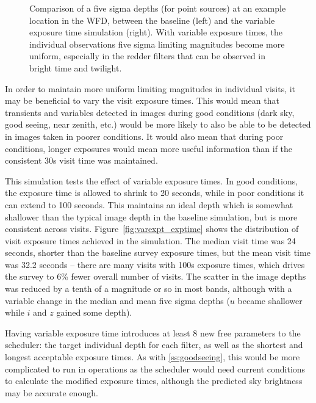 \begin{figure}
\caption{Comparison of a five sigma depths (for point sources) at an example location in the WFD, between the baseline (left) and the variable exposure time simulation (right). With variable exposure times, the individual observations five sigma limiting magnitudes become more uniform, especially in the redder filters that can be observed in bright time and twilight.}\label{fig:varexptime}
\end{figure}

In order to maintain more uniform limiting magnitudes in individual visits, it may be beneficial to vary the visit exposure times. This would mean that transients and variables detected in images during good conditions (dark sky, good seeing, near zenith, etc.) would be more likely to also be able to be detected in images taken in poorer conditions. It would also mean that during poor conditions, longer exposures would mean more useful information than if the consistent 30s visit time was maintained. 

This simulation tests the effect of variable exposure times. In good conditions, the exposure time is allowed to shrink to 20 seconds, while in poor conditions it can extend to 100 seconds. This maintains an ideal depth which is somewhat shallower than the typical image depth in the baseline simulation, but is more consistent across visits. Figure~\ref{fig:varexpt_exptime} shows the distribution of visit exposure times achieved in the simulation. The median visit time was 24 seconds, shorter than the baseline survey exposure times, but the mean visit time was 32.2 seconds -- there are many visits with 100s exposure times, which drives the survey to 6\% fewer overall number of visits. The scatter in the image depths was reduced by a tenth of a magnitude or so in most bands, although with a variable change in the median and mean five sigma depths ($u$ became shallower while $i$ and $z$ gained some depth). 

Having variable exposure time introduces at least 8 new free parameters to the scheduler: the target individual depth for each filter, as well as the shortest and longest acceptable exposure times.  As with \ref{ss:goodseeing}, this would be more complicated to run in operations as the scheduler would need current conditions to calculate the modified exposure times, although the predicted sky brightness may be accurate enough.

